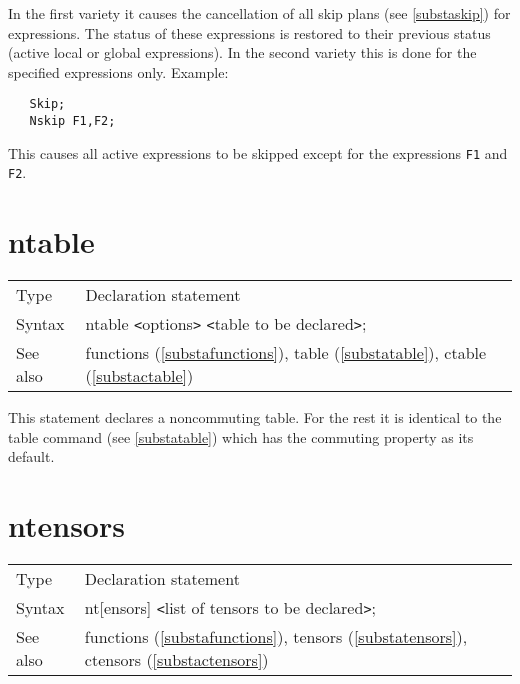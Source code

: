\noindent In the first variety it causes the cancellation of 
all skip plans (see \ref{substaskip}) for expressions. The 
status of these expressions is restored to their previous status (active 
local or global expressions). In the second variety this is done for the 
specified expressions only. Example:
\begin{verbatim}
   Skip;
   Nskip F1,F2;
\end{verbatim}
This causes all active expressions to be skipped except for the expressions 
\verb:F1: and \verb:F2:. \vspace{10mm}


\section{ntable}
\label{substantable}

\noindent \begin{tabular}{ll}
Type & Declaration statement\\
Syntax & ntable {\tt<}options{\tt>} {\tt<}table to be 
declared{\tt>}; \\
See also & functions (\ref{substafunctions}), table (\ref{substatable}),
        ctable (\ref{substactable})
\end{tabular} \vspace{4mm}

\noindent This statement declares a 
noncommuting table. For the 
rest it is identical to the table command (see 
\ref{substatable}) which has the commuting property as its default. 
\vspace{10mm}

 
\section{ntensors}
\label{substantensors}

\noindent \begin{tabular}{ll}
Type & Declaration statement\\
Syntax & nt[ensors] {\tt<}list of tensors to be declared{\tt>}; \\
See also & functions (\ref{substafunctions}), tensors 
            (\ref{substatensors}), ctensors (\ref{substactensors})
\end{tabular} \vspace{4mm}

